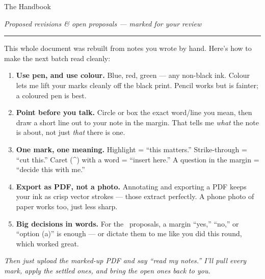 \documentclass[11pt]{article}
\newcommand{\flag}{\textcolor{gold}{\ding{110}}}      %
\begin{document}
\thispagestyle{fancy}

{\sffamily\scriptsize{}}\par
\vspace{1mm}
{\fontsize{34}{38}\selectfont The Handbook}\par
\vspace{1mm}
{\itshape\large\color{stone}Proposed revisions \& open proposals --- marked for your review}\par
\vspace{1mm}
{\color{gold}\rule{34mm}{1.2pt}}\par
\vspace{3mm}

\begin{tcolorbox}[enhanced,sharp corners,colback=navy,colframe=navy,
    coltext=cream,boxrule=0pt,borderline west={2.5pt}{0pt}{gold},
    left=5mm,right=5mm,top=4mm,bottom=4mm]
  {\sffamily\bfseries\footnotesize\textcolor{gold}%
    {}}\par\vspace{2mm}
  This whole document was rebuilt from notes you wrote by hand. Here's how to
  make the next batch read cleanly:
  \begin{enumerate}[leftmargin=7mm,itemsep=1.2mm,topsep=1.5mm]
    \item \textbf{Use pen, and use colour.} Blue, red, green --- any non-black
      ink. Colour lets me lift your marks cleanly off the black print. Pencil
      works but is fainter; a coloured pen is best.
    \item \textbf{Point before you talk.} Circle or box the exact word/line you
      mean, then draw a short line out to your note in the margin. That tells me
      \emph{what} the note is about, not just \emph{that} there is one.
    \item \textbf{One mark, one meaning.} Highlight = ``this matters.''
      Strike-through = ``cut this.'' Caret (\textasciicircum) with a word =
      ``insert here.'' A question in the margin = ``decide this with me.''
    \item \textbf{Export as PDF, not a photo.} Annotating and exporting a PDF
      keeps your ink as crisp vector strokes --- those extract perfectly. A
      phone photo of paper works too, just less sharp.
    \item \textbf{Big decisions in words.} For the \flag\ proposals, a margin
      ``yes,'' ``no,'' or ``option (a)'' is enough --- or dictate them to me
      like you did this round, which worked great.
  \end{enumerate}
  \vspace{1mm}
  {\itshape\color{cream!85}Then just upload the marked-up PDF and say ``read my
  notes.'' I'll pull every mark, apply the settled ones, and bring the open
  ones back to you.}
\end{tcolorbox}
\end{document}
